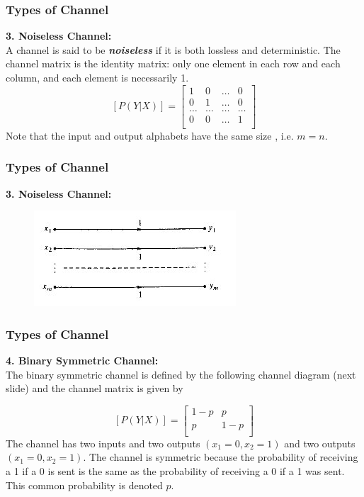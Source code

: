 \documentclass[a4]{beamer}
\begin{document}
\begin{frame}
\frametitle{Types of Channel}
\textbf{3. Noiseless Channel:}\\
A channel is said to be \emph{\textbf{noiseless}} if it is both lossless and deterministic.
The channel matrix is the identity matrix: only one element in each row and each column, and each element is necessarily 1.
\[  [P(Y|X)]  = \left[ \begin{array}{cccc}
1 &0 & \ldots & 0 \\
0 & 1& \ldots & 0 \\
\ldots & \ldots & \ldots & \ldots \\
0& 0 & \ldots & 1 \\
\end{array} \right] \]
Note that the input and output alphabets have the same size , i.e. $m=n$.
\end{frame}
\begin{frame}
\frametitle{Types of Channel}
\textbf{3. Noiseless Channel:}\\
\begin{figure}
\centering
\includegraphics[width=0.7\linewidth]{images/11BNoiseless}
\caption{}
\label{fig:11BNoiseless}
\end{figure}

\end{frame}
\begin{frame}
\frametitle{Types of Channel}
\textbf{4. Binary Symmetric Channel:}\\
The binary symmetric channel is defined by the following channel diagram (next slide) and the channel matrix is given by

\[  [P(Y|X)]  = \left[ \begin{array}{cc}
1-p & p  \\
p & 1-p\\
\end{array} \right] \]
The channel has two inputs and two outputs $(x_1=0,x_2=1)$ and two outputs $(x_1=0,x_2=1)$. The channel is symmetric because the probability of receiving a 1 if a 0 is sent is the same as the probability of receiving a 0 if a 1 was sent. This common probability is denoted $p$.
\end{frame}
\end{document}
